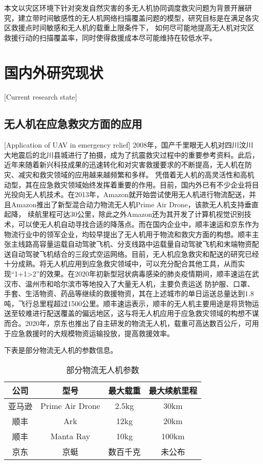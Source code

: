 本文以灾区环境下针对突发自然灾害的多无人机协同调度救灾问题为背景开展研究，建立带时间敏感性的无人机网络扫描覆盖问题的模型，研究目标是在满足各灾区救援点时间敏感和无人机的载重上限条件下，
如何尽可能地提高无人机对灾区救援行动的扫描覆盖率，同时使得救援成本尽可能维持在较低水平。


\section{国内外研究现状}[Current research state]

\subsection{无人机在应急救灾方面的应用}[Application of UAV in emergency relief]
2008年，国产千里眼无人机对四川汶川大地震后的北川县城进行了拍摄，成为了抗震救灾过程中的重要参考资料。此后，近年来随着新兴科技成果的迅速转化和对灾害救援要求的不断提高，无人机在防灾、减灾和救灾领域的应用越来越频繁和多样。
凭借着无人机的高灵活性和高机动型，其在应急救灾领域始终发挥着重要的作用。目前，国内外已有不少企业将目光投向无人机技术。在2013年，Amazon就开始尝试使用无人机进行物流配送，并且Amazon推出了新型混合动力物流无人机Prime Air Drone，该款无人机支持垂直起降，
续航里程可达30公里，除此之外Amazon还为其开发了计算机视觉识别技术，可以使无人机自动寻找合适的降落点。\cite{zhanghonghai}而在国内企业中，顺丰速运和京东作为物流行业中的领军企业，均较早提出了无人机用于物流和救灾方面的构想。顺丰主张主线路高容量运载自动驾驶飞机、分支线路中运载量自动驾驶飞机和末端物资配送自动驾驶飞机结合的三段式空运网络。目前，无人机应急救灾和配送的研究已经十分成熟。将无人机应用到应急救灾领域中，可以充分配合其他工具，从而实现“1+1>2”的效果。在2020年初新型冠状病毒感染的肺炎疫情期间，顺丰速运在武汉市、温州市和哈尔滨市等地投入了大量无人机，主要负责运送
防护服、口罩、手套、生活物资、药品等继续的救援物资，其在上述城市的单日运送总量达到1.8吨，飞行总里程超过1500公里。顺丰速运表示，顺丰的无人机主要用途是将货物运送至较难进行配送覆盖的偏远地区，这与将无人机应用于应急救灾领域的构想不谋而合。2020年，京东也推出了自主研发的物流无人机，载重可高达数百公斤，可用于应急救援时的大规模物资运输投放，提高救援效率。\cite{renxuan}


下表是部分物流无人机的参数信息。
  \begin{table}[htbp]
    \vspace{0.5em}\centering\wuhao
    \caption{部分物流无人机参数}
    \begin{tabular}{cccc}
    \toprule[1.5pt]
    公司 & 型号 & 最大载重 & 最大续航里程 \\
    \midrule[1.5pt]
    亚马逊 & Prime Air Drone & 2.5kg & 30km \\
    顺丰 & Ark & 12kg & 20km \\
    顺丰 & Manta Ray & 10kg & 100km \\
    京东 & 京蜓 & 数百千克 & 未公布 \\ 
    \bottomrule[1.5pt]
    \end{tabular}
    \end{table}

